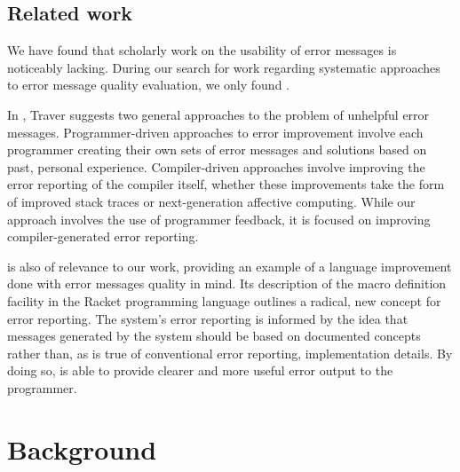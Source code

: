 \documentclass[12pt]{article}
\begin{document}
\subsection{Related work}
We have found that scholarly work on the usability of error messages is noticeably
lacking. During our search for work regarding systematic approaches to
error message quality evaluation, we only found \cite{traver:messages}.

In \cite{traver:messages}, Traver suggests 
two general approaches to the problem
of unhelpful error messages. Programmer-driven approaches to error improvement
involve each programmer creating their own sets of error messages and solutions
based on past, personal experience. Compiler-driven approaches involve improving
the error reporting of the compiler itself, whether these improvements take the
form of improved stack traces or next-generation affective computing. While our approach involves the use of programmer feedback, it is focused on improving compiler-generated error reporting. 

\cite{acm:fortify} is also of relevance to our work, providing  
an example of a language improvement done with error messages quality in mind.  
Its description of the  macro definition facility in the
Racket programming language outlines a radical, new concept for error reporting. The  system's error reporting is informed by the idea that messages generated by the system should be based on documented concepts rather than, as is true of conventional error reporting, implementation details. By doing so, \cite{acm:fortify} is able to provide clearer and more useful error output to the programmer.

\section{Background}
\end{document}
